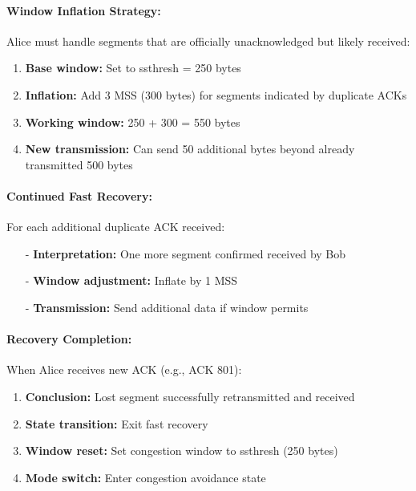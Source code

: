 \documentclass[../../compsys.tex]{subfiles}
\begin{document}
\paragraph{Window Inflation Strategy:}
Alice must handle segments that are officially unacknowledged but likely received:

\begin{enumerate}
  \item \textbf{Base window:} Set to ssthresh = 250 bytes
  \item \textbf{Inflation:} Add 3 MSS (300 bytes) for segments indicated by duplicate ACKs
  \item \textbf{Working window:} 250 + 300 = 550 bytes
  \item \textbf{New transmission:} Can send 50 additional bytes beyond already transmitted 500 bytes
\end{enumerate}

\paragraph{Continued Fast Recovery:}
For each additional duplicate ACK received:
\begin{itemize}
  \item[-] \textbf{Interpretation:} One more segment confirmed received by Bob
  \item[-] \textbf{Window adjustment:} Inflate by 1 MSS
  \item[-] \textbf{Transmission:} Send additional data if window permits
\end{itemize}

\paragraph{Recovery Completion:}
When Alice receives new ACK (e.g., ACK 801):
\begin{enumerate}
  \item \textbf{Conclusion:} Lost segment successfully retransmitted and received
  \item \textbf{State transition:} Exit fast recovery
  \item \textbf{Window reset:} Set congestion window to ssthresh (250 bytes)
  \item \textbf{Mode switch:} Enter congestion avoidance state
\end{enumerate}
\end{document}
